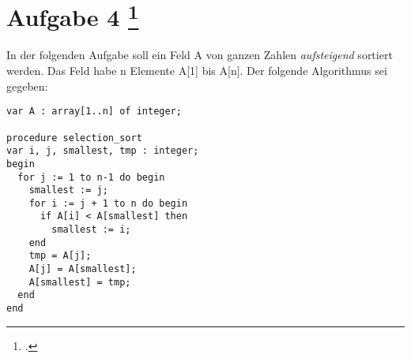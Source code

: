 \documentclass{lehramt-informatik-aufgabe}
\begin{document}
\section{Aufgabe 4
\footcite{46115:2019:09}}

In der folgenden Aufgabe soll ein Feld A von ganzen Zahlen
\emph{aufsteigend}
sortiert werden. Das Feld habe n Elemente A[1] bis A[n]. Der folgende
Algorithmus sei gegeben:

\begin{verbatim}
var A : array[1..n] of integer;

procedure selection_sort
var i, j, smallest, tmp : integer;
begin
  for j := 1 to n-1 do begin
    smallest := j;
    for i := j + 1 to n do begin
      if A[i] < A[smallest] then
        smallest := i;
    end
    tmp = A[j];
    A[j] = A[smallest];
    A[smallest] = tmp;
  end
end
\end{verbatim}
\end{document}
